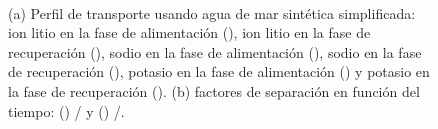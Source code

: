 \begin{figure}[H]
  \centering
    \\
    \caption[Perfil de transporte y factores de separación usando agua de mar sintética simplificada.]{(a) Perfil de transporte usando agua de mar sintética simplificada: ion litio en la fase de alimentación (\protect\squareblck), ion litio en la fase de recuperación (\protect\squarewht), sodio en la fase de alimentación (\protect\triangleupblck), sodio en la fase de recuperación (\protect\triangleupwht), potasio en la fase de alimentación (\protect\circleblck) y potasio en la fase de recuperación (\protect\circlewht).  (b) factores de separación en función del tiempo: (\protect\triangleupblck) / y (\protect\triangleupwht) /.}
  \label{fig:SSS1}
\end{figure}


